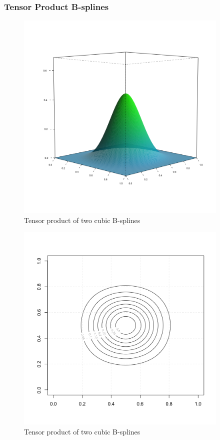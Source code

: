\documentclass[12pt]{article}
\newcommand*\outlineskeleton{\color{green}}
\begin{document}
\subsubsection{{\outlineskeleton Tensor Product B-splines}}


\begin{figure}[H]
  \centering
 \graphicspath{{img/}}
  \includegraphics[width=4in, height=4in]{bicubic_bspline.png}
  \caption{Tensor product of two cubic B-splines}\label{bicubic_bspline}
\end{figure}

\begin{figure}[H]
  \centering
  \graphicspath{{img/}}
  \includegraphics[width=4in, height=4in]{bicubic_bspline_contour.png}
  \caption{Tensor product of two cubic B-splines}\label{bicubic_bspline_contour}
\end{figure}
\end{document}
